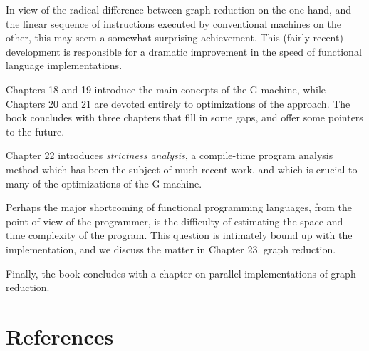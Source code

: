 In view of the radical difference between graph reduction on the one hand,
and the linear sequence of instructions executed by conventional machines on
the other, this may seem a somewhat surprising achievement. This (fairly
recent) development is responsible for a dramatic improvement in the speed
of functional language implementations.

Chapters 18 and 19 introduce the main concepts of the G-machine, while
Chapters 20 and 21 are devoted entirely to optimizations of the approach.
The book concludes with three chapters that fill in some gaps, and offer
some pointers to the future.

Chapter 22 introduces \textit{strictness analysis}, a compile-time program analysis
method which has been the subject of much recent work, and which is crucial
to many of the optimizations of the G-machine.

Perhaps the major shortcoming of functional programming languages,
from the point of view of the programmer, is the difficulty of estimating the
space and time complexity of the program. This question is intimately bound
up with the implementation, and we discuss the matter in Chapter 23.
graph reduction.

Finally, the book concludes with a chapter on parallel implementations of
graph reduction.

\pg

\section*{References}

